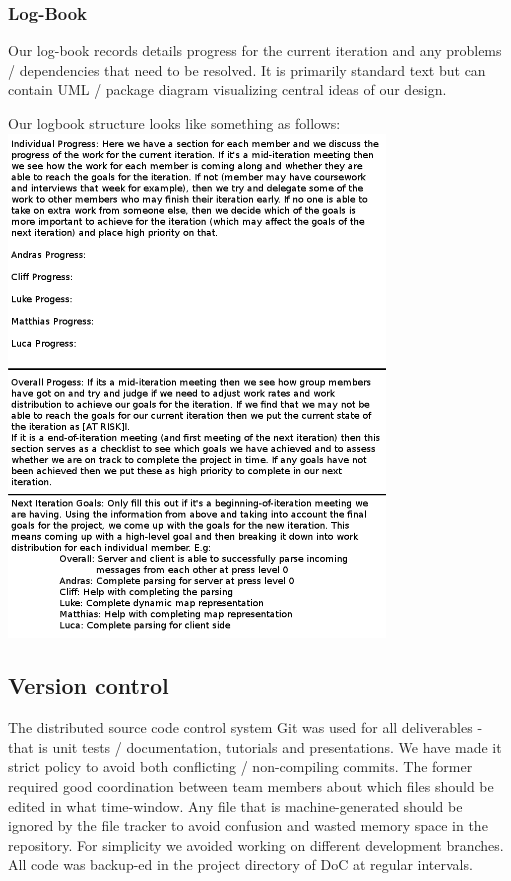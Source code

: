 \documentclass[11pt]{article}
\begin{document}
\subsubsection{Log-Book}
Our log-book records details progress for the current iteration and any problems / 
dependencies that need to be resolved. It is primarily standard text but can
contain UML / package diagram visualizing central ideas of our design.

Our logbook structure looks like something as follows:
\\ 
\includegraphics[width=100mm]{logbooktemplate.png}


\subsection{Version control}
The distributed source code control system Git was used for all deliverables -
that is unit tests / documentation, tutorials and presentations. We have made
it strict policy to avoid both conflicting / non-compiling commits. The former
required good coordination between team members about which files should be
edited in what time-window. Any file that is machine-generated should be
ignored by the file tracker to avoid confusion and wasted memory space in
the repository. For simplicity we avoided working on different development
branches. All code was backup-ed in the project directory of DoC at regular
intervals. 
\end{document}
